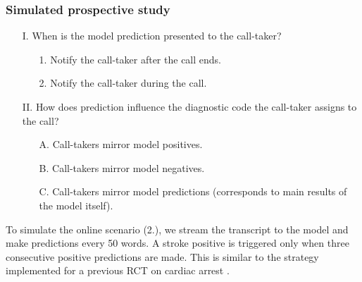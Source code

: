 \begin{frame}
    \frametitle{Simulated prospective study}
    \begin{enumerate}
        \item[I.] {\color{dtured}When} is the model prediction presented to the call-taker?
        \begin{enumerate}
            \item[1.] Notify the call-taker {\color{dtured}after the call ends}.
            \item[2.] Notify the call-taker {\color{dtured}during the call}.
        \end{enumerate}
        \item[II.] {\color{dtured}How} does prediction influence the diagnostic code the call-taker assigns to the call?
        \begin{enumerate}[label=\Alph*.]
            \item[A.] Call-takers mirror model positives.
            \item[B.] Call-takers mirror model negatives.
            \item[C.] Call-takers mirror model predictions (corresponds to main results of the model itself).
        \end{enumerate}
    \end{enumerate}
    \vspace{1em}
    To simulate the online scenario (2.), we stream the transcript to the model and make predictions every 50 words. 
    A stroke positive is triggered only when three consecutive positive predictions are made. 
    This is similar to the strategy implemented for a previous RCT on cardiac arrest \cite{cite15}.

        
\end{frame}


